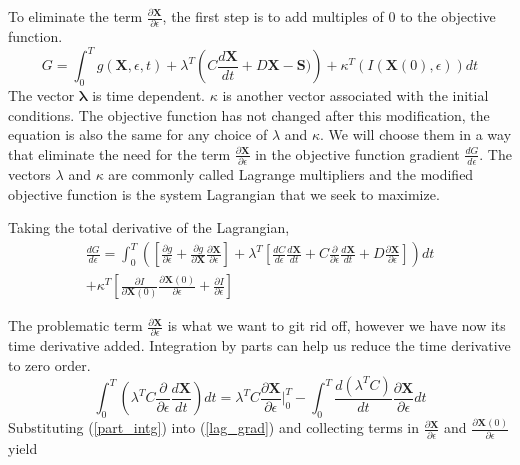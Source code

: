\documentclass{tufte-handout}
\begin{document}
 To eliminate the term $ \frac{\partial \mathbf{X}}{\partial \epsilon}$, the first step is to  add  multiples of $0$ to the objective function.
 \begin{equation}
G =  \int^T_0 g(\mathbf{X},\epsilon,t)   + \lambda^T \left( C \frac{d \mathbf{X}}{dt} + D \mathbf{X} - \mathbf{S}) \right) + \kappa^T\left( I(\mathbf{X}(0),\epsilon) \right) dt
 \end{equation}
 The vector  $\mathbf{\lambda}$  is time dependent. $\kappa$  is another vector associated with the initial conditions.   The objective function has not changed after this modification, the equation is also the same  for any choice of $\lambda$ and $\kappa$. We will choose them in a way that eliminate the need for  the term   $ \frac{\partial \mathbf{X}}{\partial \epsilon}$ in the objective function gradient $\frac{dG}{d\epsilon}$. The vectors $\lambda$ and $\kappa$ are commonly called Lagrange multipliers and the modified objective function is the system Lagrangian that we seek to maximize. 
 
 Taking the total derivative of the Lagrangian,
 \begin{multline}\label{lag_grad}
\frac{d G}{d\epsilon} = \int_{0}^{T}\left( \left[  \frac{\partial g}{\partial \epsilon} +  \frac{\partial g}{\partial \mathbf{X}} \frac{\partial \mathbf{X}}{\partial \epsilon}\right] +  \lambda^T\left[ \frac{d C}{d \epsilon} \frac{d \mathbf{X}}{dt} + C \frac{\partial}{\partial \epsilon} \frac{d \mathbf{X}}{dt} + D \frac{\partial \mathbf{X}}{\partial \epsilon} \right]  \right) dt \\ +  \kappa^T  \left[ \frac{\partial I}{\partial \mathbf{X}(0)}  \frac{\partial \mathbf{X}(0)}{\partial \epsilon} + \frac{\partial I}{\partial \epsilon} \right] 
 \end{multline}

The problematic term  $\frac{\partial \mathbf{X}}{\partial \epsilon}$  is what we want to git rid off, however we have now its time derivative added. Integration by parts can help us reduce the time derivative to zero order.  
\begin{equation}\label{part_intg}
 \int_{0}^{T} \left(  \lambda^T C \frac{\partial}{\partial \epsilon}   \frac{d \mathbf{X}}{dt} \right) dt = \lambda^T C \frac{\partial \mathbf{X}}{\partial \epsilon}|^T_0 - \int_{0}^{T}
   \frac{ d\left(  \lambda^T C \right) }{dt} \frac{\partial \mathbf{X}}{\partial \epsilon} dt
\end{equation}
Substituting (\ref*{part_intg}) into (\ref*{lag_grad}) and collecting terms  in $\frac{\partial \mathbf{X}}{\partial \epsilon}$ and  $\frac{\partial \mathbf{X}(0)}{\partial \epsilon}$ yield
\end{document}
